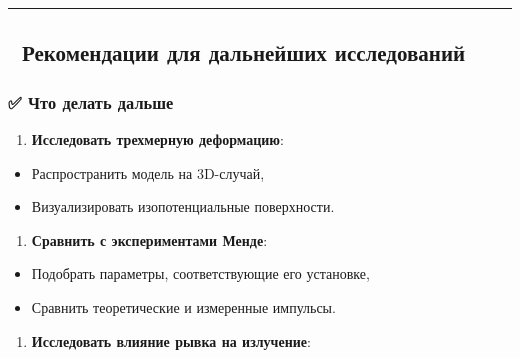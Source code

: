 \documentclass[11pt]{article}
\providecommand{\tightlist}{%
      \setlength{\itemsep}{0pt}\setlength{\parskip}{0pt}}
\begin{document}
\begin{center}\rule{0.5\linewidth}{\linethickness}\end{center}

\subsection{🎯 Рекомендации для дальнейших
исследований}\label{ux440ux435ux43aux43eux43cux435ux43dux434ux430ux446ux438ux438-ux434ux43bux44f-ux434ux430ux43bux44cux43dux435ux439ux448ux438ux445-ux438ux441ux441ux43bux435ux434ux43eux432ux430ux43dux438ux439}

\subsubsection{✅ Что делать
дальше}\label{ux447ux442ux43e-ux434ux435ux43bux430ux442ux44c-ux434ux430ux43bux44cux448ux435-2}

\begin{enumerate}
\def\labelenumi{\arabic{enumi}.}
\tightlist
\item
  \textbf{Исследовать трехмерную деформацию}:\\
\end{enumerate}

\begin{itemize}
\tightlist
\item
  Распространить модель на 3D-случай,\\
\item
  Визуализировать изопотенциальные поверхности.
\end{itemize}

\begin{enumerate}
\def\labelenumi{\arabic{enumi}.}
\setcounter{enumi}{1}
\tightlist
\item
  \textbf{Сравнить с экспериментами Менде}:\\
\end{enumerate}

\begin{itemize}
\tightlist
\item
  Подобрать параметры, соответствующие его установке,\\
\item
  Сравнить теоретические и измеренные импульсы.
\end{itemize}

\begin{enumerate}
\def\labelenumi{\arabic{enumi}.}
\setcounter{enumi}{2}
\tightlist
\item
  \textbf{Исследовать влияние рывка на излучение}:\\
\end{enumerate}
\end{document}

